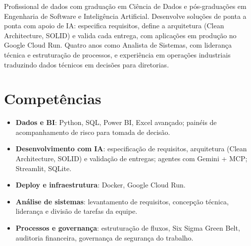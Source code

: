 \documentclass[11pt,a4paper,sans]{moderncv}
\begin{document}
\makecvtitle


\vspace{6pt}
\small{Profissional de dados com graduação em Ciência de Dados e pós-graduações em Engenharia de Software e Inteligência Artificial. Desenvolve soluções de ponta a ponta com apoio de IA: especifica requisitos, define a arquitetura (Clean Architecture, SOLID) e valida cada entrega, com aplicações em produção no Google Cloud Run. Quatro anos como Analista de Sistemas, com liderança técnica e estruturação de processos, e experiência em operações industriais traduzindo dados técnicos em decisões para diretorias.}


\section{Competências}
\vspace{1pt}
\begin{itemize}

\item \textbf{Dados e BI}: Python, SQL, Power BI, Excel avançado; painéis de acompanhamento de risco para tomada de decisão.

\item \textbf{Desenvolvimento com IA}: especificação de requisitos, arquitetura (Clean Architecture, SOLID) e validação de entregas; agentes com Gemini + MCP; Streamlit, SQLite.

\item \textbf{Deploy e infraestrutura}: Docker, Google Cloud Run.

\item \textbf{Análise de sistemas}: levantamento de requisitos, concepção técnica, liderança e divisão de tarefas da equipe.

\item \textbf{Processos e governança}: estruturação de fluxos, Six Sigma Green Belt, auditoria financeira, governança de segurança do trabalho.

\end{itemize}

\end{document}
